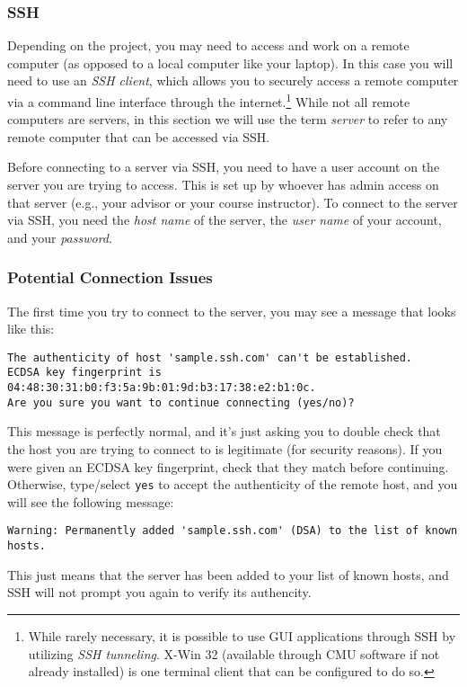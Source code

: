 \documentclass[12pt]{article}
\begin{document}
\subsubsection{SSH}
Depending on the project, you may need to access and work on a remote computer (as opposed to a local computer like your laptop). In this case you will need to use an \emph{SSH client}, which allows you to securely access a remote computer via a command line interface through the internet.\footnote{While rarely necessary, it is possible to use GUI applications through SSH by utilizing \emph{SSH tunneling}. X-Win 32 (available through CMU software if not already installed) is one terminal client that can be configured to do so.} While not all remote computers are servers, in this section we will use the term \emph{server} to refer to any remote computer that can be accessed via SSH.

Before connecting to a server via SSH, you need to have a user account on the server you are trying to access. This is set up by whoever has admin access on that server (e.g., your advisor or your course instructor). To connect to the server via SSH, you need the \emph{host name} of the server, the \emph{user name} of your account, and your \emph{password}.

\subsubsection{Potential Connection Issues}
The first time you try to connect to the server, you may see a message that looks like this:
\begin{verbatim}
The authenticity of host 'sample.ssh.com' can't be established.
ECDSA key fingerprint is 04:48:30:31:b0:f3:5a:9b:01:9d:b3:17:38:e2:b1:0c.
Are you sure you want to continue connecting (yes/no)?
\end{verbatim}
This message is perfectly normal, and it's just asking you to double check that the host you are trying to connect to is legitimate (for security reasons). If you were given an ECDSA key fingerprint, check that they match before continuing. Otherwise, type/select \texttt{yes} to accept the authenticity of the remote host, and you will see the following message:
\begin{verbatim}
Warning: Permanently added 'sample.ssh.com' (DSA) to the list of known hosts.
\end{verbatim}
This just means that the server has been added to your list of known hosts, and SSH will not prompt you again to verify its authencity.
\end{document}
